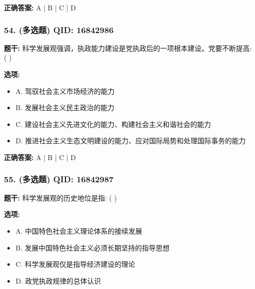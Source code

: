 \documentclass[12pt,UTF8]{ctexart}
\begin{document}
\textbf{正确答案:}
A | B | C | D

\vspace{0.3em}\hrulefill\vspace{0.7em}

\subsubsection*{54. (多选题) \small QID: 16842986}

\textbf{题干:}
科学发展观强调，执政能力建设是党执政后的一项根本建设。党要不断提高: ( )

\textbf{选项:}
\begin{itemize}[leftmargin=*]

  \item A. 驾驭社会主义市场经济的能力

  \item B. 发展社会主义民主政治的能力

  \item C. 建设社会主义先进文化的能力、构建社会主义和谐社会的能力

  \item D. 推进社会主义生态文明建设的能力、应对国际局势和处理国际事务的能力

\end{itemize}

\textbf{正确答案:}
A | B | C | D

\vspace{0.3em}\hrulefill\vspace{0.7em}

\subsubsection*{55. (多选题) \small QID: 16842987}

\textbf{题干:}
科学发展观的历史地位是指: ( )

\textbf{选项:}
\begin{itemize}[leftmargin=*]

  \item A. 中国特色社会主义理论体系的接续发展

  \item B. 发展中国特色社会主义必须长期坚持的指导思想

  \item C. 科学发展观仅是指导经济建设的理论

  \item D. 政党执政规律的总体认识

\end{itemize}
\end{document}
